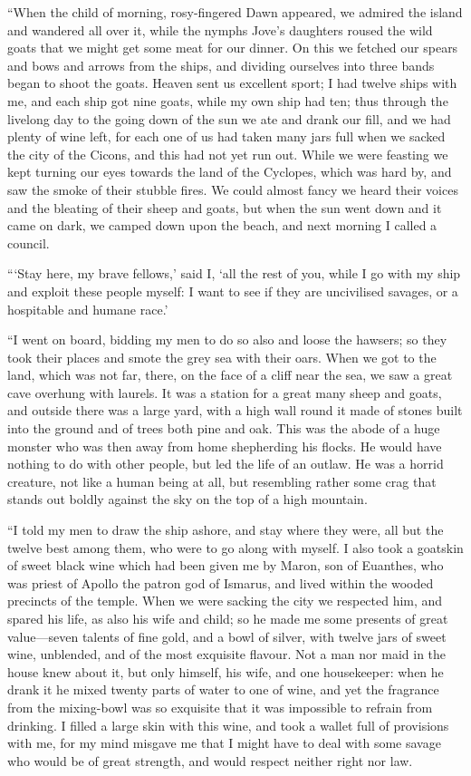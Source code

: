 “When the child of morning, rosy-fingered Dawn appeared, we admired the island
and wandered all over it, while the nymphs Jove’s daughters roused the wild
goats that we might get some meat for our dinner. On this we fetched our spears
and bows and arrows from the ships, and dividing ourselves into three bands
began to shoot the goats. Heaven sent us excellent sport; I had twelve ships
with me, and each ship got nine goats, while my own ship had ten; thus through
the livelong day to the going down of the sun we ate and drank our fill, and we
had plenty of wine left, for each one of us had taken many jars full when we
sacked the city of the Cicons, and this had not yet run out. While we were
feasting we kept turning our eyes towards the land of the Cyclopes, which was
hard by, and saw the smoke of their stubble fires. We could almost fancy we
heard their voices and the bleating of their sheep and goats, but when the sun
went down and it came on dark, we camped down upon the beach, and next morning
I called a council.

“‘Stay here, my brave fellows,’ said I, ‘all the rest of you, while I go with
my ship and exploit these people myself: I want to see if they are uncivilised
savages, or a hospitable and humane race.’

“I went on board, bidding my men to do so also and loose the hawsers; so they
took their places and smote the grey sea with their oars. When we got to the
land, which was not far, there, on the face of a cliff near the sea, we saw a
great cave overhung with laurels. It was a station for a great many sheep and
goats, and outside there was a large yard, with a high wall round it made of
stones built into the ground and of trees both pine and oak. This was the abode
of a huge monster who was then away from home shepherding his flocks. He would
have nothing to do with other people, but led the life of an outlaw. He was a
horrid creature, not like a human being at all, but resembling rather some crag
that stands out boldly against the sky on the top of a high mountain.

“I told my men to draw the ship ashore, and stay where they were, all but the
twelve best among them, who were to go along with myself. I also took a
goatskin of sweet black wine which had been given me by Maron, son of Euanthes,
who was priest of Apollo the patron god of Ismarus, and lived within the wooded
precincts of the temple. When we were sacking the city we respected him, and
spared his life, as also his wife and child; so he made me some presents of
great value—seven talents of fine gold, and a bowl of silver, with twelve jars
of sweet wine, unblended, and of the most exquisite flavour. Not a man nor maid
in the house knew about it, but only himself, his wife, and one housekeeper:
when he drank it he mixed twenty parts of water to one of wine, and yet the
fragrance from the mixing-bowl was so exquisite that it was impossible to
refrain from drinking. I filled a large skin with this wine, and took a wallet
full of provisions with me, for my mind misgave me that I might have to deal
with some savage who would be of great strength, and would respect neither
right nor law.

